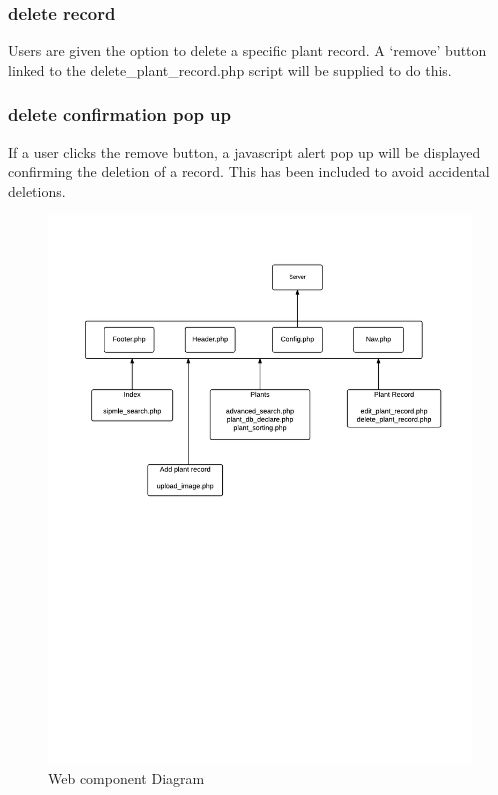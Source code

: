 	\subsubsection{delete record}
		Users are given the option to delete a specific plant record. A ‘remove’ button linked to the delete\_plant\_record.php script will be supplied to do this.

	\subsubsection{delete confirmation pop up}
		If a user clicks the remove button, a javascript alert pop up will be displayed confirming the deletion of a record. This has been included to avoid accidental deletions.

\begin{landscape}
    \begin{figure}
        \centering
        \includegraphics[scale=1]{web/webComponentDiagram.png}
        \caption{Web component Diagram}
        \label{fig:webComponentDiagram}
    \end{figure}
\end{landscape}


